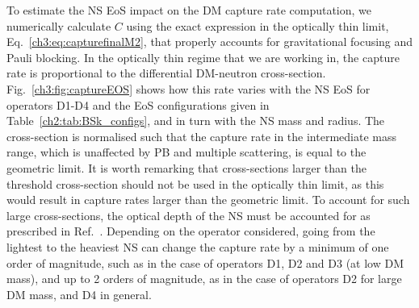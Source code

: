 



To estimate the NS EoS impact on the DM capture rate computation, we numerically calculate $C$ using the exact expression in the optically thin limit, Eq.~\ref{ch3:eq:capturefinalM2}, that properly accounts for gravitational focusing and Pauli blocking.  In the optically thin regime that we are working in, the capture rate is proportional to the differential DM-neutron cross-section. 
Fig.~\ref{ch3:fig:captureEOS} shows how this rate varies with the NS  EoS for operators D1-D4 and the EoS configurations given in Table~\ref{ch2:tab:BSk_configs}, and in turn with the NS mass and radius. 
The cross-section is normalised such that the capture rate in the intermediate mass range, which is unaffected by PB and multiple scattering, is equal to the geometric limit. It is worth remarking that cross-sections larger than the threshold cross-section should not be used in the optically thin limit, as this would result in capture rates larger than the geometric limit. To account for such large cross-sections, the optical depth of the NS must be accounted for as prescribed in Ref.~\cite{Bell:2020jou_sep_ImprovedTreatmentDark}.
Depending on the operator considered, going from the lightest to the heaviest NS can change the capture rate by a minimum of one order of magnitude, such as in the case of operators D1, D2 and D3 (at low DM mass), and up to 2 orders of magnitude, as in the case of operators D2 for large DM mass, and D4 in general. 

